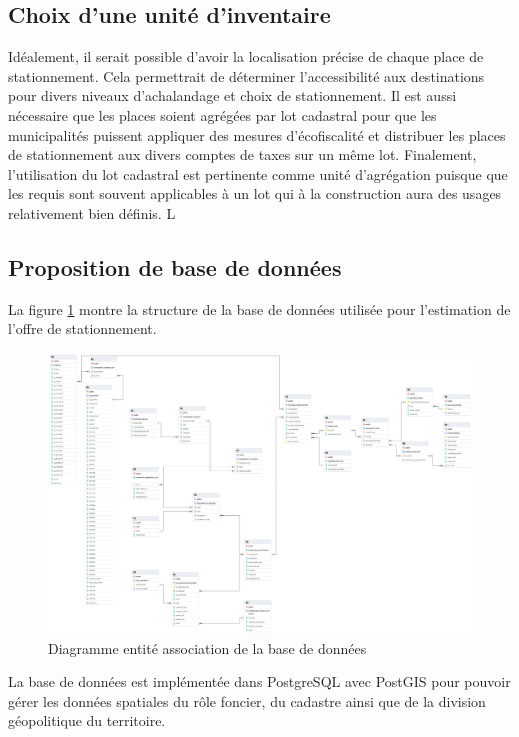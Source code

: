     \subsection{Choix d'une unité d'inventaire}
    Idéalement, il serait possible d'avoir la localisation précise de chaque place de stationnement. Cela permettrait de déterminer l'accessibilité aux destinations pour divers niveaux d'achalandage et choix de stationnement. Il est aussi nécessaire que les places soient agrégées par lot cadastral pour que les municipalités puissent appliquer des mesures d'écofiscalité et distribuer les places de stationnement aux divers comptes de taxes sur un même lot. Finalement, l'utilisation du lot cadastral est pertinente comme unité d'agrégation puisque que les requis sont souvent applicables à un lot qui à la construction aura des usages relativement bien définis. L
    \subsection{Proposition de base de données}
    La figure \ref{fig:offstreet_db_erd} montre la structure de la base de données utilisée pour l'estimation de l'offre de stationnement. 
    \begin{landscape}
    \begin{figure}
        \centering
        \includegraphics[width = 0.85\linewidth]{images/structure_base_de_donnee.png}
        \caption{Diagramme entité association de la base de données}\label{fig:offstreet_db_erd}
    \end{figure}
    \end{landscape}
    La base de données est implémentée dans PostgreSQL avec PostGIS pour pouvoir gérer les données spatiales du rôle foncier, du cadastre ainsi que de la division géopolitique du territoire.\par
    
